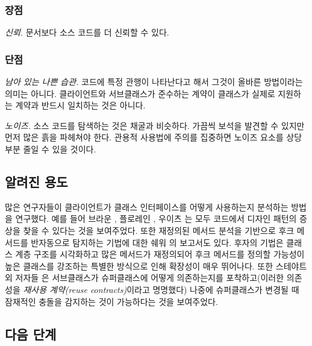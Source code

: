 \documentclass[a4paper,10pt,twoside]{book}
\begin{document}
\subsubsection*{장점}

\begin{bulletlist}
\item \emph{신뢰.}
문서보다 소스 코드를 더 신뢰할 수 있다.
\end{bulletlist}

\subsubsection*{단점}

\begin{bulletlist}
\item \emph{남아 있는 나쁜 습관.}
코드에 특정 관행이 나타난다고 해서 그것이 올바른 방법이라는 의미는 아니다. 클라이언트와 서브클래스가 준수하는 계약이 클래스가 실제로 지원하는 계약과 반드시 일치하는 것은 아니다.

\item \emph{노이즈.}
소스 코드를 탐색하는 것은 채굴과 비슷하다. 가끔씩 보석을 발견할 수 있지만 먼저 많은 흙을 파헤쳐야 한다. 관용적 사용법에 주의를 집중하면 노이즈 요소를 상당 부분 줄일 수 있을 것이다.
\end{bulletlist}

\subsection*{알려진 용도}

많은 연구자들이 클라이언트가 클래스 인터페이스를 어떻게 사용하는지 분석하는 방법을 연구했다. 예를 들어 브라운 \cite{Brow96c}, 플로레인 \cite{Flor97a}, 우이츠 \cite{Wuyt98a}는 모두 코드에서 디자인 패턴의 증상을 찾을 수 있다는 것을 보여주었다. 또한 재정의된 메서드 분석을 기반으로 후크 메서드를 반자동으로 탐지하는 기법에 대한 쉐워 \cite{Scha99a}의 보고서도 있다. 후자의 기법은 클래스 계층 구조를 시각화하고 많은 메서드가 재정의되어 후크 메서드를 정의할 가능성이 높은 클래스를 강조하는 특별한 방식으로 인해 확장성이 매우 뛰어나다. 또한 스테야트 외 저자들 \cite{Stey96a}은 서브클래스가 슈퍼클래스에 어떻게 의존하는지를 포착하고(이러한 의존성을 \emph{재사용 계약(reuse contracts)}이라고 명명했다) 나중에 슈퍼클래스가 변경될 때 잠재적인 충돌을 감지하는 것이 가능하다는 것을 보여주었다.

\subsection*{다음 단계}
\end{document}
